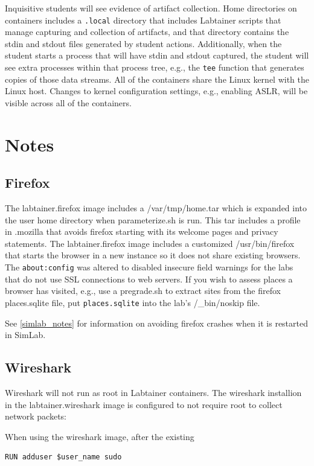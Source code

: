 \documentclass[12pt]{article}
\begin{document}
Inquisitive students will see evidence of artifact collection.  Home directories
on containers includes a \texttt{.local} directory that includes Labtainer scripts that manage
capturing and collection of artifacts, and that directory contains the stdin and
stdout files generated by student actions. Additionally, when the student starts a process
that will have stdin and stdout captured, the student will see extra processes within
that process tree, e.g., the \texttt{tee} function that generates copies of those data streams.
All of the containers share the Linux kernel with the Linux host.  Changes to
kernel configuration settings, e.g., enabling ASLR, will be visible across all
of the containers.


\section{Notes} \label{Notes}
\label{Notes}
\subsection{Firefox}
The labtainer.firefox image includes a /var/tmp/home.tar 
which is expanded into the user home directory when parameterize.sh is run.
This tar includes a profile in .mozilla that avoids firefox starting with its 
welcome pages and privacy statements.  The labtainer.firefox image includes a 
customized /usr/bin/firefox that starts the browser in a new instance so it does 
not share existing browsers.  The {\tt about:config}
was altered to disabled insecure field warnings for the labs that do not use SSL connections to web servers.
If you wish to assess places a browser has visited, e.g., use a pregrade.sh to extract sites from the
firefox places.sqlite file, put {\tt places.sqlite} into the lab's /\_bin/noskip file.

See \ref{simlab_notes} for information on avoiding firefox crashes when it is restarted in SimLab.

\subsection{Wireshark}
Wireshark will not run as root in Labtainer containers.  
The wireshark installion in the labtainer.wireshark image is configured to not
require root to collect network packets:

When using the wireshark image, after the existing 
\begin{verbatim}
RUN adduser $user_name sudo
\end{verbatim}
\end{document}
